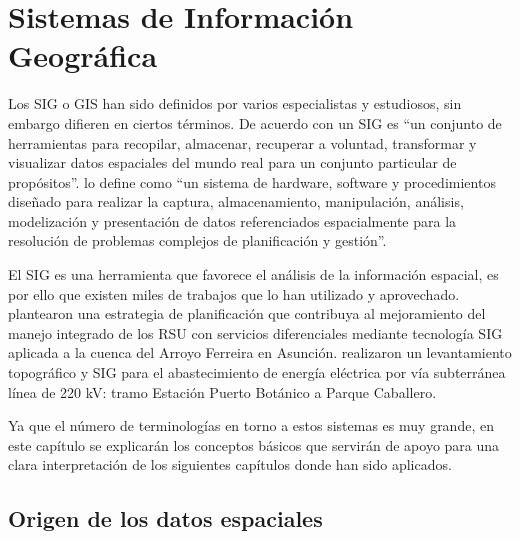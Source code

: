 \chapter{Sistemas de Información Geográfica}
\label{chap3}
\ifpdf
    \graphicspath{{Chapter3/Chapter3Figs/PNG/}{Chapter3/Chapter3Figs/PDF/}{Chapter3/Chapter3Figs/}}
\else
    \graphicspath{{Chapter3/Chapter3Figs/EPS/}{Chapter3/Chapter3Figs/}}
\fi


Los SIG o GIS han sido definidos por varios especialistas y estudiosos, sin embargo difieren en ciertos términos. De acuerdo con \citet{Burrough1986PrinciplesAssessment} un SIG es “un conjunto de herramientas para recopilar, almacenar, recuperar a voluntad, transformar y visualizar datos espaciales del mundo real para un conjunto particular de propósitos”. \citet{NCGIA1990IntroductionGIS} lo define como “un sistema de hardware, software y procedimientos diseñado para realizar la captura, almacenamiento, manipulación, análisis, modelización y presentación de datos referenciados espacialmente para la resolución de problemas complejos de planificación y gestión”.

El SIG es una herramienta que favorece el análisis de la información espacial, es por ello que existen miles de trabajos que lo han utilizado y aprovechado. \citet{Cabral2018EstrategiasAsuncion} plantearon una estrategia de planificación que contribuya al mejoramiento del manejo integrado de los RSU con servicios diferenciales mediante tecnología SIG aplicada a la cuenca del Arroyo Ferreira en Asunción. \citet{Acosta2006LevantamientoCaballero} realizaron un levantamiento topográfico y SIG para el abastecimiento de energía eléctrica por vía subterránea línea de 220 kV: tramo Estación Puerto Botánico a Parque Caballero.


Ya que el número de terminologías en torno a estos sistemas es muy grande, en este capítulo se explicarán los conceptos básicos que servirán de apoyo para una clara interpretación de los siguientes capítulos donde han sido aplicados.

\section{Origen de los datos espaciales}


